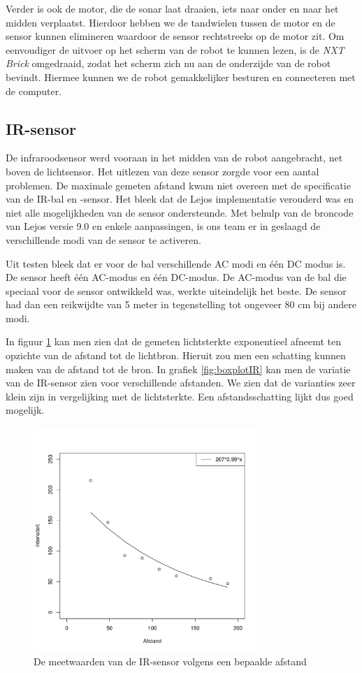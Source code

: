 \documentclass[12pt,a4paper]{report}
\begin{document}
Verder is ook de motor, die de sonar laat draaien, iets naar onder en naar het midden verplaatst. Hierdoor hebben we de tandwielen tussen de motor en de sensor kunnen elimineren waardoor de sensor rechtstreeks op de motor zit. Om eenvoudiger de uitvoer op het scherm van de robot te kunnen lezen, is de \emph{NXT Brick} omgedraaid, zodat het scherm zich nu aan de onderzijde van de robot bevindt. Hiermee kunnen we de robot gemakkelijker besturen en connecteren met de computer.

\subsection{IR-sensor}

De infraroodsensor werd vooraan in het midden van de robot aangebracht, net boven de lichtsensor. Het uitlezen van deze sensor zorgde voor een aantal problemen. De maximale gemeten afstand kwam niet overeen met de specificatie van de IR-bal en -sensor. Het bleek dat de Lejos implementatie verouderd was en niet alle mogelijkheden van de sensor ondersteunde. Met behulp van de broncode van Lejos versie 9.0 en enkele aanpassingen, is ons team er in geslaagd de verschillende modi van de sensor te activeren.

Uit testen bleek dat er voor de bal verschillende AC modi en \'e\'en DC modus is. De sensor heeft \'e\'en AC-modus en \'e\'en DC-modus. De AC-modus van de bal die speciaal voor de sensor ontwikkeld was, werkte uiteindelijk het beste. De sensor had dan een reikwijdte van 5 meter in tegenstelling tot ongeveer 80 cm bij andere modi.

In figuur \ref{fig:plotIR} kan men zien dat de gemeten lichtsterkte exponentieel afneemt ten opzichte van de afstand tot de lichtbron.
Hieruit zou men een schatting kunnen maken van de afstand tot de bron. In grafiek \ref{fig:boxplotIR} kan men de variatie van de IR-sensor zien voor verschillende afstanden. We zien dat de varianties zeer klein zijn in vergelijking met de lichtsterkte. Een afstandsschatting lijkt dus goed mogelijk.

\begin{figure}[htbp]
  \centering
  \includegraphics[width=85mm]{resources/plotIR.pdf}
  \caption{De meetwaarden van de IR-sensor volgens een bepaalde afstand}
  \label{fig:plotIR}
\end{figure}
\end{document}
